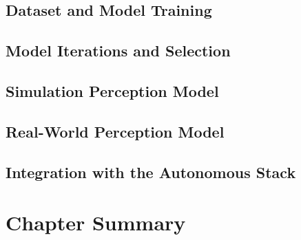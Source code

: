 \subsection{Dataset and Model Training}
\label{sec:perception_dataset}

\subsection{Model Iterations and Selection}
\label{sec:perception_models}

\subsection{Simulation Perception Model}
\label{sec:perception_sim}

\subsection{Real-World Perception Model}
\label{sec:perception_real}

\subsection{Integration with the Autonomous Stack}
\label{sec:perception_integration}

\section{Chapter Summary}
\label{sec:ch5_summary}

